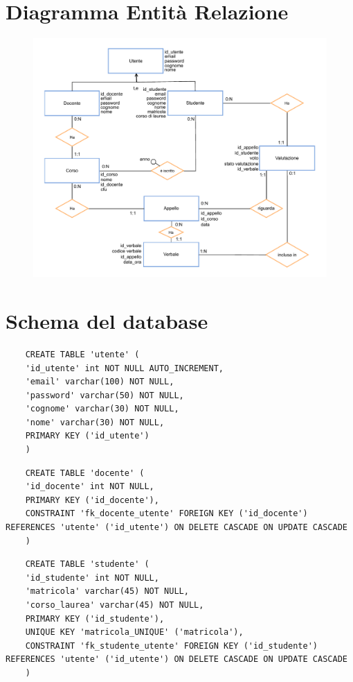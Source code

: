 \documentclass[a4paper,12pt]{scrreprt}
\begin{document}
\section{Diagramma Entità Relazione}
\begin{figure}[htbp]
    \centering
    \includegraphics[width=1.0\textwidth]{diagrammaER.drawio.pdf}
\end{figure}

\newpage

\section{Schema del database}


\begin{lstlisting}
    CREATE TABLE 'utente' (
    'id_utente' int NOT NULL AUTO_INCREMENT,
    'email' varchar(100) NOT NULL,
    'password' varchar(50) NOT NULL,
    'cognome' varchar(30) NOT NULL,
    'nome' varchar(30) NOT NULL,
    PRIMARY KEY ('id_utente')
    )
\end{lstlisting}

\begin{lstlisting}
    CREATE TABLE 'docente' (
    'id_docente' int NOT NULL,
    PRIMARY KEY ('id_docente'),
    CONSTRAINT 'fk_docente_utente' FOREIGN KEY ('id_docente') REFERENCES 'utente' ('id_utente') ON DELETE CASCADE ON UPDATE CASCADE
    )
\end{lstlisting}


\begin{lstlisting}
    CREATE TABLE 'studente' (
    'id_studente' int NOT NULL,
    'matricola' varchar(45) NOT NULL,
    'corso_laurea' varchar(45) NOT NULL, 
    PRIMARY KEY ('id_studente'),
    UNIQUE KEY 'matricola_UNIQUE' ('matricola'),
    CONSTRAINT 'fk_studente_utente' FOREIGN KEY ('id_studente') REFERENCES 'utente' ('id_utente') ON DELETE CASCADE ON UPDATE CASCADE
    )
\end{lstlisting}
\end{document}
